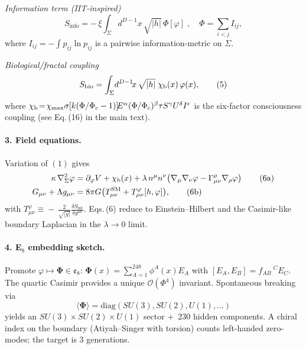 \documentclass[11pt]{article}
\begin{document}
\smallskip
\noindent\emph{Information term (IIT-inspired)}
\begin{equation}
  S_{\text{info}}
   = -\,\xi \!\int_\Sigma\! d^{D-1}\!x\,\sqrt{|h|}
     \,\Phi[\varphi]\; ,\quad
  \Phi=\sum_{i<j} I_{ij},                                           \tag{4}
\end{equation}
where $I_{ij}=-\!\int p_{ij}\ln p_{ij}$ is a pairwise
information-metric on $\Sigma$.

\smallskip
\noindent\emph{Biological/fractal coupling}
\begin{equation}
  S_{\text{bio}}
   = \int_\Sigma\! d^{D-1}\!x\,\sqrt{|h|}\;
     \chi_{\text b}(x)\,\varphi(x),                                 \tag{5}
\end{equation}
where $\chi_{\text b}\!=\!\chi_{\max}\sigma[k(\Phi/\Phi_c-1)]\!E^{\alpha}
             (\Phi/\Phi_c)^{\beta}\tau S^{\gamma}U^{\delta}I^{\epsilon}$ is
the six-factor consciousness coupling (see Eq.\,(16) in the main text).

\paragraph{3. Field equations.}
Variation of $(1)$ gives
\begin{align}
  \kappa\,\nabla^2_\Sigma\varphi
  &= \partial_\varphi V
     +\chi_{\text b}(x)
     +\lambda\,n^\mu n^\nu\!\left(\nabla_\mu\nabla_\nu\varphi
                    -\Gamma^\rho_{\mu\nu}\nabla_\rho\varphi\right)  \tag{6a}\\
  G_{\mu\nu}+ \Lambda g_{\mu\nu}
  &= 8\pi G\bigl(T^{\text{SM}}_{\mu\nu}
       +T^{\varphi}_{\mu\nu}[h,\varphi]\bigr),                     \tag{6b}
\end{align}
with $T^{\varphi}_{\mu\nu}\!\equiv\!-\,\frac{2}{\sqrt{|g|}}
          \frac{\delta S_{\text{int}}}{\delta g^{\mu\nu}}$.
Eqs.\,(6) reduce to Einstein–Hilbert and the Casimir-like
boundary Laplacian in the $\lambda\!\to\!0$ limit.

\paragraph{4. E$_8$ embedding sketch.}
Promote $\varphi\mapsto\bm{\Phi}\in\mathfrak{e}_8$:
$\bm{\Phi}(x)=\sum_{A=1}^{248}\!\phi^A(x)E_A$ with
$[E_A,E_B]=f_{AB}{}^{\;C}E_C$.  The quartic Casimir provides
a unique $\mathcal O(\Phi^4)$ invariant.  Spontaneous breaking via
\[
  \langle\bm{\Phi}\rangle=\mathrm{diag}(SU(3),SU(2),U(1),\dots)
\]
yields an $SU(3)\times SU(2)\times U(1)$ sector $+$~230
hidden components.  A chiral index on the boundary
(Atiyah–Singer with torsion) counts left-handed
zero-modes; the target is $3$ generations.
\end{document}
